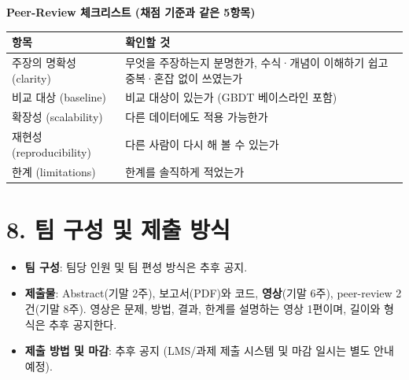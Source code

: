 \documentclass[12pt]{article}
\begin{document}
\vspace{4pt}
\noindent\begin{minipage}{\linewidth}
\noindent\textbf{Peer-Review 체크리스트 (채점 기준과 같은 5항목)}
\begin{center}
\small
\begin{tabular}{@{}>{\raggedright\arraybackslash}p{4.0cm}>{\raggedright\arraybackslash}p{8.6cm}@{}}
\toprule
항목 & 확인할 것 \\
\midrule
주장의 명확성 (clarity) & 무엇을 주장하는지 분명한가, 수식·개념이 이해하기 쉽고 중복·혼잡 없이 쓰였는가 \\
비교 대상 (baseline) & 비교 대상이 있는가 (GBDT 베이스라인 포함) \\
확장성 (scalability) & 다른 데이터에도 적용 가능한가 \\
재현성 (reproducibility) & 다른 사람이 다시 해 볼 수 있는가 \\
한계 (limitations) & 한계를 솔직하게 적었는가 \\
\bottomrule
\end{tabular}
\end{center}
\end{minipage}

\section*{8. 팀 구성 및 제출 방식}
\begin{itemize}
\item \textbf{팀 구성}: 팀당 인원 및 팀 편성 방식은 추후 공지.
\item \textbf{제출물}: Abstract(기말 2주), 보고서(PDF)와 코드, \textbf{영상}(기말 6주), peer-review 2건(기말 8주). 영상은 문제, 방법, 결과, 한계를 설명하는 영상 1편이며, 길이와 형식은 추후 공지한다.
\item \textbf{제출 방법 및 마감}: 추후 공지 (LMS/과제 제출 시스템
  및 마감 일시는 별도 안내 예정).
\end{itemize}
\end{document}
